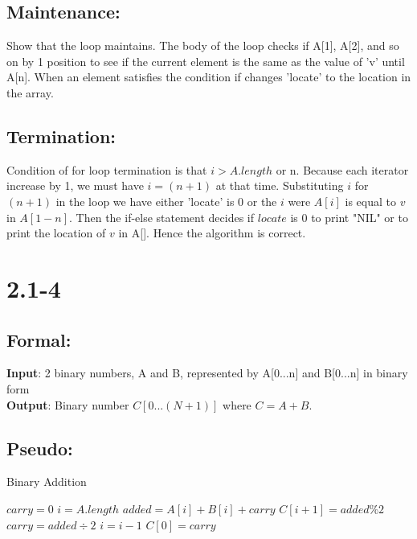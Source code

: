 \documentclass[12pt]{article}
\begin{document}
    \subsection*{Maintenance:}
    Show that the loop maintains. The body of the loop checks if A[1], A[2], and so on by 1 position to see if the current element is the same as the value of 'v' until A[n]. When an element satisfies the condition if changes 'locate' to the location in the array.
    \subsection*{Termination:}
    Condition of for loop termination is that $i > A.length$ or n. Because each iterator increase by 1, we must have $i=(n+1)$ at that time. Substituting $i$ for $(n+1)$ in the loop we have either 'locate' is 0 or the $i$ were $A[i]$ is equal to $v$ in $A[1-n]$. Then the if-else statement decides if $locate$ is 0 to print "NIL" or to print the location of $v$ in A[]. Hence the algorithm is correct.
\section{2.1-4}
    \subsection*{Formal:}
    \textbf{Input}: 2 binary numbers, A and B, represented by A[0...n] and B[0...n] in binary form\\
    \textbf{Output}: Binary number $C[0...(N+1)]$ where $C = A+B$.
    \subsection*{Pseudo:}   
	\begin{algorithm}
	\caption{Binary Addition}
	\begin{algorithmic} 
	\STATE $carry = 0$
	\STATE $ i = A.length $
		\STATE $added = A[i] + B[i] +carry $
		\STATE $C[i + 1] = added \% 2 $
		\STATE $ carry = added \div 2 $
		\STATE $ i = i - 1$
	\ENDWHILE
	\STATE $ C[0] = carry$
	\end{algorithmic}
	\end{algorithm}
\end{document}
